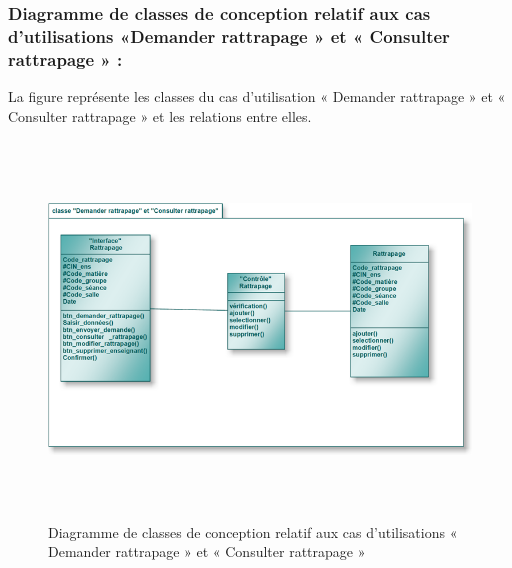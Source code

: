 \documentclass[12 pt]{report}
\begin{document}
\subsubsection{Diagramme de classes de conception relatif aux cas d'utilisations      «Demander rattrapage » et « Consulter rattrapage »  :}
La figure  représente les classes du cas d’utilisation « Demander rattrapage » et « Consulter rattrapage » et les relations entre elles.
\begin{figure}[h]
 \begin{center}
\includegraphics[width= 16 cm ,height=  10cm]{cl_dr.PNG}
\caption{Diagramme de classes de conception relatif aux cas d'utilisations « Demander rattrapage » et « Consulter rattrapage » }

\end{center}
\end{figure}
\end{document}
